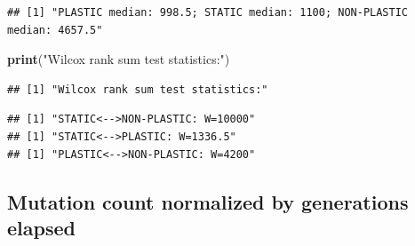 \documentclass[]{book}
\newenvironment{Shaded}{\begin{snugshade}}{\end{snugshade}}
\newcommand{\ControlFlowTok}[1]{\textcolor[rgb]{0.13,0.29,0.53}{\textbf{#1}}}
\newcommand{\DataTypeTok}[1]{\textcolor[rgb]{0.13,0.29,0.53}{#1}}
\newcommand{\DecValTok}[1]{\textcolor[rgb]{0.00,0.00,0.81}{#1}}
\newcommand{\KeywordTok}[1]{\textcolor[rgb]{0.13,0.29,0.53}{\textbf{#1}}}
\newcommand{\NormalTok}[1]{#1}
\newcommand{\OperatorTok}[1]{\textcolor[rgb]{0.81,0.36,0.00}{\textbf{#1}}}
\newcommand{\OtherTok}[1]{\textcolor[rgb]{0.56,0.35,0.01}{#1}}
\newcommand{\StringTok}[1]{\textcolor[rgb]{0.31,0.60,0.02}{#1}}
\begin{document}
\begin{verbatim}
## [1] "PLASTIC median: 998.5; STATIC median: 1100; NON-PLASTIC median: 4657.5"
\end{verbatim}

\begin{Shaded}
\begin{Highlighting}[]
\KeywordTok{print}\NormalTok{(}\StringTok{"Wilcox rank sum test statistics:"}\NormalTok{)}
\end{Highlighting}
\end{Shaded}

\begin{verbatim}
## [1] "Wilcox rank sum test statistics:"
\end{verbatim}

\begin{Shaded}
\end{Shaded}

\begin{verbatim}
## [1] "STATIC<-->NON-PLASTIC: W=10000"
## [1] "STATIC<-->PLASTIC: W=1336.5"
## [1] "PLASTIC<-->NON-PLASTIC: W=4200"
\end{verbatim}

\hypertarget{mutation-count-normalized-by-generations-elapsed}{%
\subsection{Mutation count normalized by generations elapsed}\label{mutation-count-normalized-by-generations-elapsed}}
\end{document}
